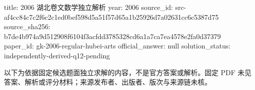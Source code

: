 title: 2006 湖北卷文数学独立解析
year: 2006
source_id: src-af4cc84c7c2f6c2c1ed0bef598d5a51f57d65a1b25926d7a02631cc6c5387d75
source_sha256: b7de4b974a9d512908f6104f3acfdd3785328cd6a1a7ca7ea4578e2fa0d37379
paper_id: gk-2006-regular-hubei-arts
official_answer: null
solution_status: independently-derived-q12-pending
\par\medskip

\begin{gktip}
以下为依据固定候选题面独立求解的内容，不是官方答案或解析。固定 PDF 未见答案、解析或评分材料；来源发布者、出版者、版次与来源链未核。
\end{gktip}

